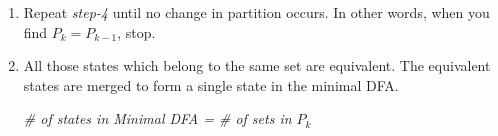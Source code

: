 \begin{multicols}{2}
\begin{enumerate}
  \item Repeat \textit{step-4} until no change in partition occurs. In other words, when you find $P_k = P_{k - 1}$, stop.
  
  \item All those states which belong to the same set are equivalent. The equivalent states are merged to form a single state in the minimal DFA.
    \begin{center}
      \textit{\# of states in Minimal DFA = \# of sets in $P_k$  }
    \end{center}
\end{enumerate}

\end{multicols}
